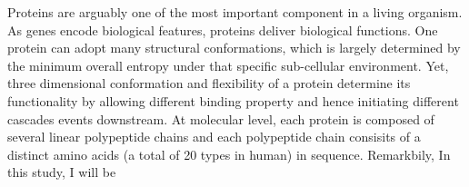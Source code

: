 Proteins are arguably one of the most important component in a living organism. As genes encode biological features, proteins deliver biological functions. One protein can adopt many structural conformations, which is largely determined by the minimum overall entropy under that specific sub-cellular environment. Yet, three dimensional conformation and flexibility of a protein determine its functionality by allowing different binding property and hence initiating different cascades events downstream. At molecular level, each protein is composed of several linear polypeptide chains and each polypeptide chain consisits of a distinct amino acids (a total of 20 types in human) in sequence. Remarkbily,  In this study, I will be 